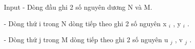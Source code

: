 Input
- Dòng đầu ghi 2 số nguyên dương N và M.  

   - Dòng thứ i trong N dòng tiếp theo ghi 2 số nguyên x   $_    i   $   , y   $_    i   $   .  

   - Dòng thứ j trong M dòng tiếp theo ghi 2 số nguyên u   $_    j   $   , v   $_    j   $   .